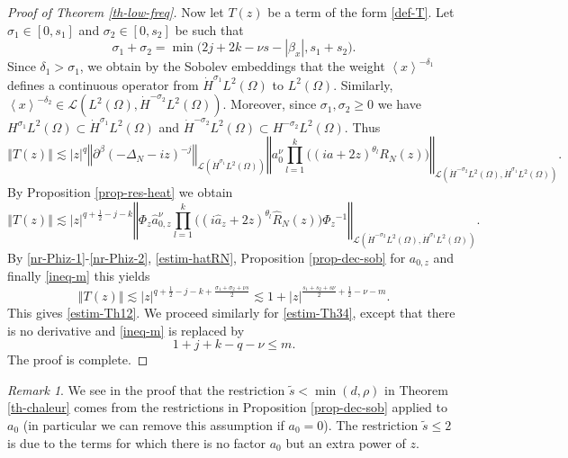 \documentclass[10pt, a4paper,reqno]{amsart}
\theoremstyle{plain}
\theoremstyle{definition}
\theoremstyle{remark}
\newtheorem{remark}[theorem]{Remark}
\begin{document}
\begin{proof}[Proof of Theorem \ref{th-low-freq}]
{\noindent {\bf $\bullet$}\quad } 
Now let $T(z)$ be a term of the form \eqref{def-T}. 
Let ${\sigma}_1 \in [0,s_1]$ and ${\sigma}_2 \in [0,s_2]$ be such that
\[
{\sigma}_1 + {\sigma}_2 = \min\big( 2j + 2k - {\nu} s - {\left\vert {{\beta}_x}\right\vert}, s_1 + s_2 \big).
\]
Since ${\delta}_1 > {\sigma}_1$, we obtain by the Sobolev embeddings that the weight ${\left< x \right>}^{-{\delta}_1}$ defines a continuous operator from $\dot H^{{\sigma}_1} L^2({\Omega})$ to $L^2({\Omega})$. Similarly, ${\left< x \right>}^{-{\delta}_2} \in {{\mathcal L}}(L^2({\Omega}), \dot H^{-{\sigma}_2}L^2({\Omega}))$. Moreover, since ${\sigma}_1,{\sigma}_2 {\geqslant} 0$ we have $H^{{\sigma}_1}L^2({\Omega}) \subset \dot H^{{\sigma}_1} L^2({\Omega})$ and $\dot H^{-{\sigma}_2}L^2({\Omega}) \subset H^{-{\sigma}_2} L^2({\Omega})$.
Thus 
\[
{\left\Vert {T(z)}\right\Vert} \lesssim {\left\vert z\right\vert}^{q} {\left\Vert {\partial^{\beta} (-{{\Delta}_N}  -i z)^{-j}}\right\Vert}_{{{\mathcal L}}(\dot H^{{\sigma}_1}L^2({\Omega}))} {\left\Vert { a_0^\nu \prod_{l=1}^k \big( (ia + 2z)^{{\theta}_l} {R_N(z)} \big)}\right\Vert}_{{{\mathcal L}}(\dot H^{-{\sigma}_2}L^2({\Omega}) , \dot H^{{\sigma}_1}L^2({\Omega}))}.
\]
By Proposition \ref{prop-res-heat} we obtain
\[
{\left\Vert {T(z)}\right\Vert} \lesssim {\left\vert z\right\vert}^{q + \frac 12 - j - k }{\left\Vert {\Phi_z \hat a_{0,z}^\nu \prod_{l=1}^k \big( (i\hat a_z + 2z)^{{\theta}_l} {\hat R_N(z)} \big) \Phi_z{^{-1}}}\right\Vert}_{{{\mathcal L}}(\dot H^{-{\sigma}_2}L^2({\Omega}) , \dot H^{{\sigma}_1}L^2({\Omega}))}.
\]
By \eqref{nr-Phiz-1}-\eqref{nr-Phiz-2}, \eqref{estim-hatRN}, Proposition \ref{prop-dec-sob} for $a_{0,z}$ and finally \eqref{ineq-m} this yields
\[
{\left\Vert {T(z)}\right\Vert} \lesssim {\left\vert z\right\vert}^{q + \frac 12 - j - k + \frac {{\sigma}_1 + {\sigma}_2 + {\nu} s}2} \lesssim 1 + {\left\vert z\right\vert} ^{\frac {s_1+s_2 +s {\nu}} 2 + \frac 12 - {\nu} - m}.
\]
This gives \eqref{estim-Th12}. We proceed similarly for \eqref{estim-Th34}, except that there is no derivative and \eqref{ineq-m} is replaced by 
\[
1 + j + k - q - {\nu} {\leqslant} m.
\]
The proof is complete.
\end{proof}

\begin{remark} \label{rem-tilde-s}
We see in the proof that the restriction $\tilde s < \min(d,\rho)$ in Theorem \ref{th-chaleur} comes from the restrictions in Proposition \ref{prop-dec-sob} applied to $a_0$ (in particular we can remove this assumption if $a_0 = 0$). The restriction $\tilde s {\leqslant} 2$ is due to the terms for which there is no factor $a_0$ but an extra power of $z$.
\end{remark}
\end{document}
